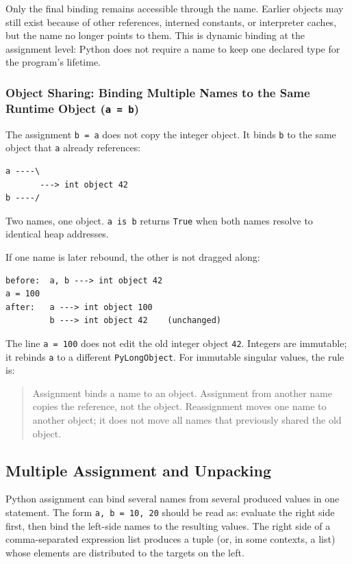 \documentclass[a4paper,twoside]{report}
\begin{document}
Only the final binding remains accessible through the name. Earlier objects may still exist because of other references, interned constants, or interpreter caches, but the name no longer points to them. This is dynamic binding at the assignment level: Python does not require a name to keep one declared type for the program's lifetime.

\subsubsection{Object Sharing: Binding Multiple Names to the Same Runtime Object (\texttt{a = b})}

The assignment \texttt{b = a} does not copy the integer object. It binds \texttt{b} to the same object that \texttt{a} already references:

\begin{verbatim}
a ----\
       ---> int object 42
b ----/
\end{verbatim}

Two names, one object. \texttt{a is b} returns \texttt{True} when both names resolve to identical heap addresses.

If one name is later rebound, the other is not dragged along:

\begin{verbatim}
before:  a, b ---> int object 42
a = 100
after:   a ---> int object 100
         b ---> int object 42    (unchanged)
\end{verbatim}

The line \texttt{a = 100} does not edit the old integer object \texttt{42}. Integers are immutable; it rebinds \texttt{a} to a different \texttt{PyLongObject}. For immutable singular values, the rule is:

\begin{quote}
Assignment binds a name to an object. Assignment from another name copies the reference, not the object. Reassignment moves one name to another object; it does not move all names that previously shared the old object.
\end{quote}


\subsection{Multiple Assignment and Unpacking}

Python assignment can bind several names from several produced values in one statement. The form \texttt{a, b = 10, 20} should be read as: evaluate the right side first, then bind the left-side names to the resulting values. The right side of a comma-separated expression list produces a tuple (or, in some contexts, a list) whose elements are distributed to the targets on the left.
\end{document}
